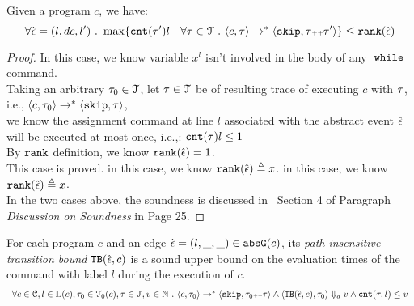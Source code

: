   \begin{lem}
    \label{lem:local_bound_sound}
  Given a program ${c}$, we have:
  \[
  \forall \absevent = (l, dc, l') \st 
  \max \left\{ \counter(\vtrace') l ~ \middle\vert~
  \forall \vtrace \in \mathcal{T} \st \config{{c}, \trace} \to^{*} \config{\eskip, \trace\tracecat\vtrace'} \right\} 
  \leq 
  \locbound(\absevent)
  \]
  \end{lem}
  \begin{proof}
    In this case, we know variable $x^l$ isn't involved in the body of any $\;\mathtt{while}\;$ command. 
    \\
    Taking an arbitrary $\mathtt{\tau}_0 \in \mathcal{T}$, 
    let $\mathtt{\tau} \in \mathcal{T}$ be of resulting trace of executing $c$ with $\mathtt{\tau}$, 
    i.e., $\langle {c}, \mathtt{\tau}_0 \rangle \to^{*} \langle \mathtt{skip}, \mathtt{\tau} \rangle$,
    \\
    we know the
    assignment command at line $l$ associated with the abstract event $\hat{\mathtt{\epsilon}{}}$ will be executed at most once, i.e.,:
    $\mathtt{cnt}(\mathtt{\tau}) l \leq 1$
    \\
    By $\mathtt{rank}$ definition, we know $\mathtt{rank}(\hat{\mathtt{\epsilon}{}}) = 1$.
    \\
    This case is proved.
      in this case, we know $\mathtt{rank}(\hat{\mathtt{\epsilon}{}}) \triangleq x$.
      in this case, we know $\mathtt{rank}(\hat{\mathtt{\epsilon}{}}) \triangleq x$.
    \\
    In the two cases above, the soundness is discussed in~\cite{sinn2017complexity} Section 4 of Paragraph \emph{Discussion on Soundness} in Page 25.
  \end{proof}
  \begin{thm}
  For each program ${c}$ and an edge $\hat{\mathtt{\epsilon}{}} = (l, \_, \_) \in \mathtt{abs}{\mathtt{G}}(c)$, 
  its \emph{path-insensitive transition bound} ${\mathtt{TB}}(\hat{\mathtt{\epsilon}{}}, c)$ 
   is a sound upper bound on 
  the evaluation times of the command with label $l$ during the execution of $c$.
    \[
      \begin{array}{l}
        \forall c \in \mathcal{C}, l \in \mathbb{L}(c),\mathtt{\tau}_0 \in \mathcal{T}_0(c), 
        \mathtt{\tau} \in \mathcal{T}, v \in \mathbb{N}
         ~.~ 
         \langle {c}, \mathtt{\tau}_0 \rangle \to^{*} \langle \mathtt{skip}, \mathtt{\tau}_0{\scriptscriptstyle ++}\mathtt{\tau} \rangle 
         \land \langle {\ensuremath{\mathtt{TB}}}(\hat{\mathtt{\epsilon}{}}, c), \mathtt{\tau}_0 \rangle \Downarrow_a v
         \land
        \mathtt{cnt}(\mathtt{\tau}, l) \leq v
      \end{array}
      \]
  \end{thm}
